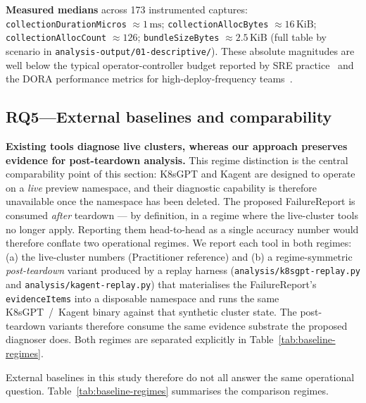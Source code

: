 \documentclass[sigconf, nonacm=true, anonymous=false, review=false]{acmart}
\newcommand{\RQ}[1]{RQ#1\xspace}
\newcommand{\fp}{FailureReport\xspace}
\begin{document}
\textbf{Measured medians} across 173 instrumented captures:
\texttt{collectionDurationMicros} $\approx 1\,\text{ms}$;
\texttt{collectionAllocBytes} $\approx 16\,\text{KiB}$;
\texttt{collectionAllocCount} $\approx 126$;
\texttt{bundleSizeBytes} $\approx 2.5\,\text{KiB}$ (full table by
scenario in \texttt{analysis-output/01-descriptive/}). These
absolute magnitudes are well below the typical operator-controller
budget reported by SRE practice~\cite{beyer_sre_2016, bass_devops_2015}
and the DORA performance metrics for high-deploy-frequency
teams~\cite{forsgren_accelerate_2018}.

\subsection{\RQ{5}---External baselines and comparability}
\label{sec:eval-baselines}

\noindent\textbf{Existing tools diagnose live clusters, whereas our
approach preserves evidence for post-teardown analysis.}
This regime distinction is the central comparability point of this
section: K8sGPT and Kagent are designed to operate on a \emph{live}
preview namespace, and their diagnostic capability is therefore
unavailable once the namespace has been deleted. The proposed \fp{}
is consumed \emph{after} teardown --- by definition, in a regime
where the live-cluster tools no longer apply. Reporting them
head-to-head as a single accuracy number would therefore conflate
two operational regimes. We report each tool in both regimes:
(a) the live-cluster numbers (Practitioner reference) and
(b) a regime-symmetric \emph{post-teardown} variant produced by a
replay harness (\texttt{analysis/k8sgpt-replay.py} and
\texttt{analysis/kagent-replay.py}) that materialises the
\fp{}'s \texttt{evidenceItems} into a disposable namespace and runs
the same K8sGPT~/~Kagent binary against that synthetic cluster
state. The post-teardown variants therefore consume the same
evidence substrate the proposed diagnoser does. Both regimes are
separated explicitly in Table~\ref{tab:baseline-regimes}.

External baselines in this study therefore do not all answer the same
operational question. Table~\ref{tab:baseline-regimes} summarises the
comparison regimes.
\end{document}

